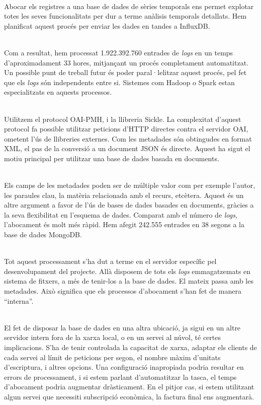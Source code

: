 \noindent \\
Abocar els registres a una base de dades de sèries temporals ens permet explotar totes les seves funcionalitats per dur a terme anàlisis temporals detallats.
Hem planificat aquest procés per enviar les dades en tandes a InfluxDB.

\noindent \\
Com a resultat, hem processat 1.922.392.760 entrades de \textit{\gls{log}s} en un temps d'aproximadament 33 hores, mitjançant un procés completament automatitzat.
Un possible punt de treball futur és poder paral·lelitzar aquest procés, pel fet que els \textit{\gls{log}s} són independents entre si.
Sistemes com Hadoop o Spark estan especialitzats en aquests processos.

\noindent \\
Utilitzem el protocol OAI-PMH, i la llibreria Sickle.
La complexitat d'aquest protocol fa possible utilitzar peticions d'\gls{HTTP} directes contra el servidor OAI, ometent l'ús de llibreries externes.
Com les metadades són obtingudes en format XML, el pas de la conversió a un document \gls{JSON} és directe.
Aquest ha sigut el motiu principal per utilitzar una base de dades basada en documents.

\noindent \\
Els camps de les metadades poden ser de múltiple valor com per exemple l’autor, les paraules clau, la matèria relacionada amb el recurs, etcètera.
Aquest és un altre argument a favor de l’ús de bases de dades basades en documents, gràcies a la seva flexibilitat en l’esquema de dades.
Comparat amb el número de \textit{\gls{log}s}, l'abocament és molt més ràpid.
Hem afegit 242.555 entrades en 38 segons a la base de dades MongoDB.

\noindent \\
Tot aquest processament s'ha dut a terme en el servidor específic pel desenvolupament del projecte.
Allà disposem de tots els \textit{\gls{log}s} emmagatzemats en sistema de fitxers, a més de tenir-los a la base de dades.
El mateix passa amb les metadades.
Això significa que els processos d'abocament s'han fet de manera “interna”.

\noindent \\
El fet de disposar la base de dades en una altra ubicació, ja sigui en un altre servidor intern fora de la xarxa local, o en un servei al núvol, té certes implicacions.
S'ha de tenir controlada la capacitat de xarxa, adaptar els clients de cada servei al límit de peticions per segon, el nombre màxim d'unitats d'escriptura, i altres opcions.
Una configuració inapropiada podria resultar en errors de processament, i si estem parlant d'automatitzar la tasca, el temps d'abocament podria augmentar dràsticament.
En el pitjor cas, si estem utilitzant algun servei que necessiti subscripció econòmica, la factura final ens augmentarà.

